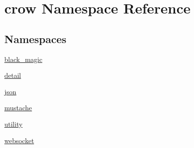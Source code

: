 \hypertarget{namespacecrow}{\section{crow Namespace Reference}
\label{namespacecrow}
}
\subsection*{Namespaces}
\begin{DoxyCompactItemize}
\item 
\hyperlink{namespacecrow_1_1black__magic}{black\-\_\-magic}
\item 
\hyperlink{namespacecrow_1_1detail}{detail}
\item 
\hyperlink{namespacecrow_1_1json}{json}
\item 
\hyperlink{namespacecrow_1_1mustache}{mustache}
\item 
\hyperlink{namespacecrow_1_1utility}{utility}
\item 
\hyperlink{namespacecrow_1_1websocket}{websocket}
\end{DoxyCompactItemize}
